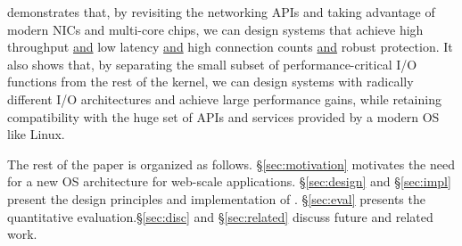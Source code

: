 \ix demonstrates that, by revisiting the networking APIs and taking
advantage of modern NICs and multi-core chips, we can design systems
that achieve high throughput \underline{and} low latency
\underline{and} high connection counts \underline{and} robust
protection. It also shows that, by separating the small subset of
performance-critical I/O functions from the rest of the kernel, we can
design systems with radically different I/O architectures and achieve
large performance gains, while retaining compatibility with the huge
set of APIs and services provided by a modern OS like Linux.










 The rest of the paper is 
organized as follows. \S \ref{sec:motivation} motivates the need
for a new OS architecture for web-scale applications. \S\ref{sec:design} and \S\ref{sec:impl} present the design principles and
implementation of \ix. \S\ref{sec:eval} presents the
quantitative evaluation.\S\ref{sec:disc} and \S\ref{sec:related} discuss future and related work.






